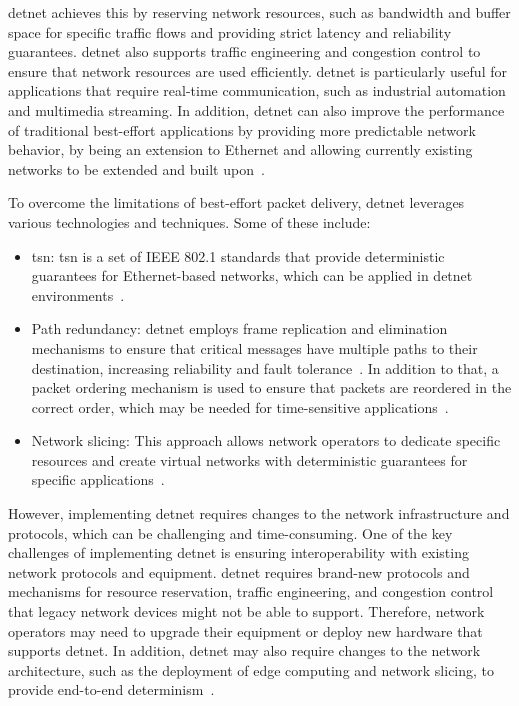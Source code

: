 \documentclass[runningheads]{llncs}
\begin{document}
\gls{detnet} achieves this by reserving network resources, such as bandwidth and buffer space for specific traffic flows and providing strict latency and reliability guarantees. \gls{detnet} also supports traffic engineering and congestion control to ensure that network resources are used efficiently. \gls{detnet} is particularly useful for applications that require real-time communication, such as industrial automation and multimedia streaming. In addition, \gls{detnet} can also improve the performance of traditional best-effort applications by providing more predictable network behavior, by being an extension to Ethernet and allowing currently existing networks to be extended and built upon~\cite{rfc8578}.

To overcome the limitations of best-effort packet delivery, \gls{detnet} leverages various technologies and techniques. Some of these include:

\begin{itemize}
  \item \gls{tsn}: \gls{tsn} is a set of IEEE 802.1 standards that provide deterministic guarantees for Ethernet-based networks, which can be applied in \gls{detnet} environments~\cite{rfc9023}.
  \item Path redundancy: \gls{detnet} employs frame replication and elimination mechanisms to ensure that critical messages have multiple paths to their destination, increasing reliability and fault tolerance~\cite{rfc8655}. In addition to that, a packet ordering mechanism is used to ensure that packets are reordered in the correct order, which may be needed for time-sensitive applications~\cite{ietf-detnet-pof-02}.
  \item Network slicing: This approach allows network operators to dedicate specific resources and create virtual networks with deterministic guarantees for specific applications~\cite{Bhattacharjee2021,rfc8578}.
\end{itemize}

However, implementing \gls{detnet} requires changes to the network infrastructure and protocols, which can be challenging and time-consuming. One of the key challenges of implementing \gls{detnet} is ensuring interoperability with existing network protocols and equipment. \gls{detnet} requires brand-new protocols and mechanisms for resource reservation, traffic engineering, and congestion control that legacy network devices might not be able to support. Therefore, network operators may need to upgrade their equipment or deploy new hardware that supports \gls{detnet}. In addition, \gls{detnet} may also require changes to the network architecture, such as the deployment of edge computing and network slicing, to provide end-to-end determinism~\cite{rfc8655}.
\end{document}
